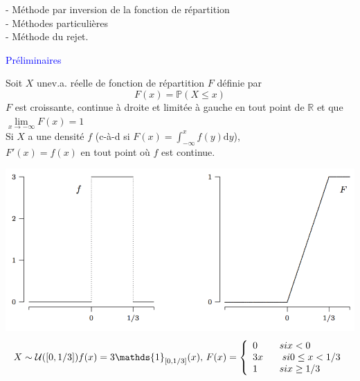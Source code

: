 {- Méthode par inversion de la fonction de répartition\\
- Méthodes particulières\\
- Méthode du rejet. \\

\begin{Large}
\hspace{2mm} \colorbox{gray!20}{\textcolor{blue}{Préliminaires}}
\end{Large}

\hspace{4mm} Soit $X$ unev.a. réelle de fonction de répartition $F$ définie par
\[ F(x) = \mathbb{P} (X \leq x)\]
$F$ est croissante, continue à droite et limitée à gauche en tout point de $\mathbb{R}$ et que $\underset{x\to - \infty}{\lim} F(x) =1$ \\%
\vspace{1mm}
Si $X$ a une densité $f$ (c-à-d si $F(x) = \int_{- \infty}^{x} f(y) \mathrm{d}y$), \\
$F'(x) = f(x)$ en tout point où $f$ est continue. %

\includegraphics[scale=0.6]{content/Figure4.PNG}
\[ X \sim \mathcal{U} ([0,1/3]) \\
f(x) = 3 \mathds{1}_{[0,1/3]} (x), \,
F(x) = \left\{
\begin{array}{ll}
0 \hspace{8mm} si x <0 \\
3x \hspace{7mm} si 0 \leq x < 1/3 \\
1 \hspace{8mm} si x \geq 1/3

\end{array}
\right.  \]

}
